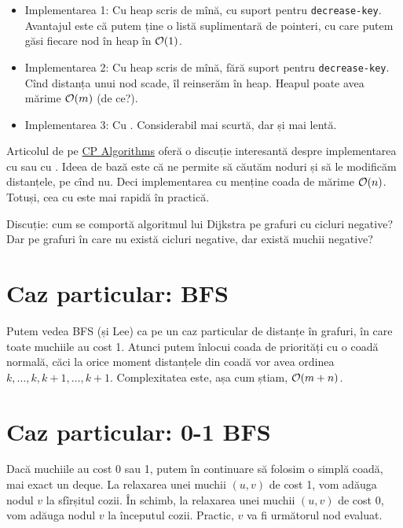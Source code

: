 \documentclass[../main.tex]{subfiles}
\begin{document}
\begin{itemize}
  \item Implementarea 1: Cu heap scris de mînă, cu suport pentru \texttt{decrease-key}. Avantajul este că putem ține o listă suplimentară de pointeri, cu care putem găsi fiecare nod în heap în $\mathcal{O}(1)$.

  \item Implementarea 2: Cu heap scris de mînă, fără suport pentru \texttt{decrease-key}. Cînd distanța unui nod scade, îl reinserăm în heap. Heapul poate avea mărime $\mathcal{O}(m)$ (de ce?).

  \item Implementarea 3: Cu . Considerabil mai scurtă, dar și mai lentă.
\end{itemize}

Articolul de pe \href{https://cp-algorithms.com/graph/dijkstra_sparse.html}{CP Algorithms} oferă o discuție interesantă despre implementarea cu  sau cu . Ideea de bază este că  ne permite să căutăm noduri și să le modificăm distanțele, pe cînd  nu. Deci implementarea cu  menține coada de mărime $\mathcal{O}(n)$. Totuși, cea cu  este mai rapidă în practică.

Discuție: cum se comportă algoritmul lui Dijkstra pe grafuri cu cicluri negative? Dar pe grafuri în care nu există cicluri negative, dar există muchii negative?

\section{Caz particular: BFS}

Putem vedea BFS (și Lee) ca pe un caz particular de distanțe în grafuri, în care toate muchiile au cost 1. Atunci putem înlocui coada de priorități cu o coadă normală, căci la orice moment distanțele din coadă vor avea ordinea $k, \dots, k, k + 1, \dots, k + 1$. Complexitatea este, așa cum știam, $\mathcal{O}(m + n)$.

\section{Caz particular: 0-1 BFS}

Dacă muchiile au cost 0 sau 1, putem în continuare să folosim o simplă coadă, mai exact un deque. La relaxarea unei muchii $(u,v)$ de cost 1, vom adăuga nodul $v$ la sfîrșitul cozii. În schimb, la relaxarea unei muchii $(u,v)$ de cost 0, vom adăuga nodul $v$ la începutul cozii. Practic, $v$ va fi următorul nod evaluat.
\end{document}
